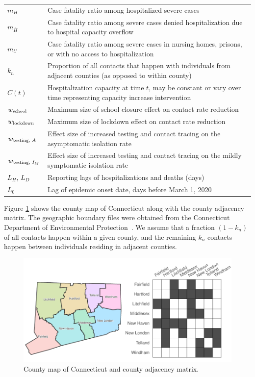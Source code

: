 \documentclass[11pt]{article}
\begin{document}
\begin{table}[!htb]
\begin{tabular}{p{} p{} }
	$m_H$ & Case fatality ratio among hospitalized severe cases \\[0.5em]
	$m_{\bar{H}}$ & Case fatality ratio among severe cases denied hospitalization due to hospital capacity overflow \\[0.5em]
	$m_{U}$ & Case fatality ratio among severe cases in nursing homes, prisons, or with no access to hospitalization \\[0.5em]
	$k_n$ & Proportion of all contacts that happen with individuals from adjacent counties (as opposed to within county) \\[0.5em]
	$C(t)$ & Hospitalization capacity at time $t$, may be constant or vary over time representing capacity increase intervention \\[0.5em]
	$w\textsubscript{school}$ & Maximum size of school closure effect on contact rate reduction \\[0.5em]
	$w\textsubscript{lockdown}$ & Maximum size of lockdown effect on contact rate reduction \\[0.5em]
	$w\textsubscript{testing, $A$}$ & Effect size of increased testing and contact tracing on the asymptomatic isolation rate  \\[0.5em]
	$w\textsubscript{testing, $I_M$}$ & Effect size of increased testing and contact tracing on the mildly symptomatic isolation rate \\[0.5em]
	$L_H$, $L_D$ & Reporting lags of hospitalizations and deaths (days) \\[0.5em]
	$L_0$ & Lag of epidemic onset date, days before March 1, 2020 \\[0.5em]
	\bottomrule
	\end{tabular}
	\label{table:params}
\end{table}
\endgroup

Figure \ref{fig:map} shows the county map of Connecticut along with the county adjacency matrix. The geographic boundary files were obtained from the Connecticut Department of Environmental Protection~\citep{shapefile}. We assume that a fraction $(1-k_n)$ of all contacts happen within a given county, and the remaining $k_n$ contacts happen between individuals residing in adjacent counties.

\begin{figure} %
	\centering
	\includegraphics[width=.7\textwidth]{figures/map_adj.pdf}
	\caption{County map of Connecticut and county adjacency matrix.}
	\label{fig:map}
\end{figure}
\end{document}

